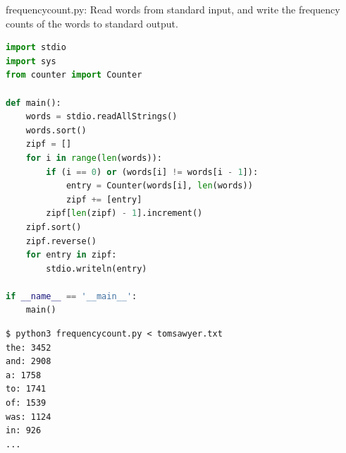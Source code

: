 \documentclass[8pt,a4paper,compress]{beamer}
\begin{document}
\begin{frame}[fragile]
\pause

\begin{framed}
\tiny frequencycount.py: Read words from standard input, and write the frequency counts of the words to standard output.
\end{framed}

\begin{lstlisting}[language=python,style=focusin]
import stdio
import sys
from counter import Counter

def main():
    words = stdio.readAllStrings()
    words.sort()
    zipf = []
    for i in range(len(words)):
        if (i == 0) or (words[i] != words[i - 1]):
            entry = Counter(words[i], len(words))
            zipf += [entry]
        zipf[len(zipf) - 1].increment()
    zipf.sort()
    zipf.reverse()
    for entry in zipf:
        stdio.writeln(entry)

if __name__ == '__main__':
    main()
\end{lstlisting}

\pause

\begin{lstlisting}[language={},style=focusin]
$ python3 frequencycount.py < tomsawyer.txt
the: 3452
and: 2908
a: 1758
to: 1741
of: 1539
was: 1124
in: 926
...
\end{lstlisting}
\end{frame}
\end{document}
